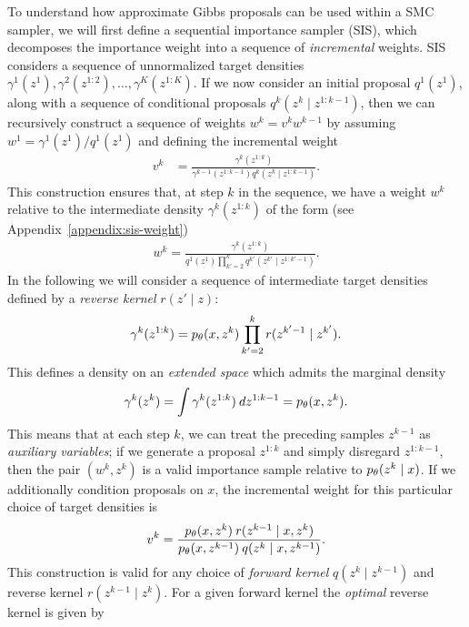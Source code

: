 \documentclass{article}
\theoremstyle{definition}
\begin{document}
To understand how approximate Gibbs proposals can be used within a SMC sampler, we will first define a sequential importance sampler (SIS), which decomposes the importance weight into a sequence of \emph{incremental} weights. SIS considers a sequence of unnormalized target densities $\gamma^1(z^1), \gamma^2(z^{1:2}), \dots, \gamma^K(z^{1:K})$. If we now consider an initial proposal $q^1(z^1)$, along with a sequence of conditional proposals $q^k(z^k \mid z^{1:k-1})$, then we can recursively construct a sequence of weights $w^k = v^k w^{k-1}$ by assuming $w^1 = \gamma^1(z^1) / q^1(z^1)$ and defining the incremental weight
\begin{align*}
    v^k 
    &=
    \frac{\gamma^k(z^{1:k})}{\gamma^{k-1}(z^{1:k-1}) q^k(z^k \mid z^{1:k-1})}.
\end{align*}
This construction ensures that, at step $k$ in the sequence, we have a weight $w^k$ relative to the intermediate  density $\gamma^k(z^{1:k})$ of the form (see Appendix~\ref{appendix:sis-weight})
\begin{align*}
    w^k
    = 
    \frac{\gamma^k(z^{1:k})}
         {q^1(z^1) \prod_{k'=2}^k q^{k'}(z^{k'} \mid z^{1:k'-1})}.
\end{align*}
In the following we will consider a sequence of intermediate target densities defined by a \emph{reverse kernel} $r(z' \mid z)$:
\begin{align*}
    \gamma^k(z^{1:k})
    =
    p_\theta(x,z^k) \prod_{k'=2}^{k} r(z^{k'-1} \mid z^{k'})
    .
\end{align*}
This defines a density on an \emph{extended space} which admits the marginal density
\begin{align*}
    \gamma^k(z^k) = \int \gamma^k(z^{1:k}) \: dz^{1:k-1} = p_\theta(x, z^k).
\end{align*}
This means that at each step $k$, we can treat the preceding samples $z^{k-1}$ as \emph{auxiliary variables}; if we generate a proposal $z^{1:k}$ and simply disregard $z^{1:k-1}$, then the pair $(w^k, z^k)$ is a valid importance sample relative to $p_\theta(z^k \mid x)$. If we additionally condition proposals on $x$, the incremental weight for this particular choice of target densities is
\begin{align}
    \label{eq:incremental-weight-forward-reverse}
    v^k 
    = 
    \frac{p_\theta(x,z^k) \: r(z^{k-1} \mid x, z^k)}
         {p_\theta(x,z^{k-1}) \: q(z^{k} \mid x, z^{k-1})}
    .
\end{align}
This construction is valid for any choice of \emph{forward kernel}  $q(z^k \mid z^{k-1})$ and reverse kernel $r(z^{k-1} \mid z^{k})$. For a given forward kernel the \emph{optimal} reverse kernel is given by
\end{document}

